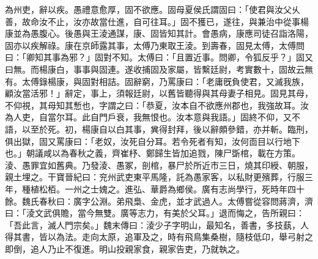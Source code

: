 \begin{pinyinscope}
為州吏，辭以疾。愚禮意愈厚，固不欲應。固母夏侯氏謂固曰：「使君與汝父乆善，故命汝不止，汝亦故當仕進，自可往耳。」固不獲已，遂往，與兼治中從事楊康並為愚腹心。後愚與王淩通謀，康、固皆知其計。會愚病，康應司徒召詣洛陽，固亦以疾解祿。康在京師露其事，太傅乃東取王淩。到壽春，固見太傅，太傅問曰：「卿知其事為邪？」固對不知。太傅曰：「且置近事。問卿，令狐反乎？」固又曰無。而楊康白，事事與固連。遂收捕固及家屬，皆繫廷尉，考實數十，固故云無有。太傅錄楊康，與固對相詰。固辭窮，乃罵康曰：「老庸旣負使君，又滅我族，顧汝當活邪！」辭定，事上，須報廷尉，以舊皆聽得與其母妻子相見。固見其母，不仰視，其母知其慙也，字謂之曰：「恭夏，汝本自不欲應州郡也，我強故耳。汝為人吏，自當尔耳。此自門戶衰，我無恨也。汝本意與我語。」固終不仰，又不語，以至於死。初，楊康自以白其事，兾得封拜，後以辭頗參錯，亦并斬。臨刑，俱出獄，固又罵康曰：「老奴，汝死自分耳。若令死者有知，汝何靣目以行地下也。」朝議咸以為春秋之義，齊崔杼、鄭歸生皆加追戮，陳尸斲棺，載在方策。淩、愚罪宜如舊典。乃發淩、愚冢，剖棺，暴尸於所近市三日，燒其印綬、朝服，親土埋之。干寶晉紀曰：兖州武吏東平馬隆，託為愚家客，以私財更殯葬，行服三年，種植松栢。一州之士媿之。進弘、華爵為鄉侯。廣有志尚學行，死時年四十餘。魏氏春秋曰：廣字公淵。弟飛梟、金虎，並才武過人。太傅嘗從容問蔣濟，濟曰：「淩文武俱贍，當今無雙。廣等志力，有美於父耳。」退而悔之，告所親曰：「吾此言，滅人門宗矣。」魏末傳曰：淩少子字明山，最知名，善書，多技蓺，人得其書，皆以為法。走向太原，追軍及之，時有飛鳥集桑樹，隨枝低卬，舉弓射之即倒，追人乃止不復進。明山投親家食，親家告吏，乃就執之。


\end{pinyinscope}